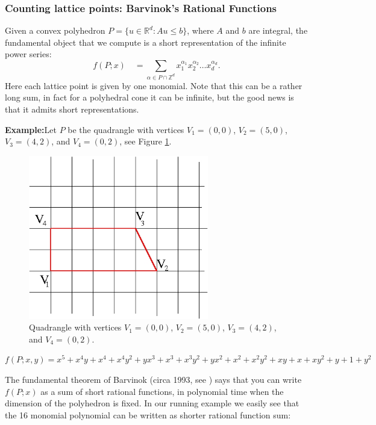 \documentclass{article}
\newcommand{\Z}{{\mathbb Z}}
\newcommand{\R}{{\mathbb R}}
\newcommand{\example}{{\bf Example:\space}}
\begin{document}
\subsubsection{Counting lattice points: Barvinok's Rational Functions}

Given a convex polyhedron $P = \{u\in\R^d:Au\leq b\}$, where $A$ and
$b$ are integral, the fundamental object that we compute is a short 
representation of the infinite power series:
\[
f(P;x) \quad = \sum_{\alpha\in P\cap\Z^d} x_1^{\alpha_1}
x_2^{\alpha_2} \ldots x_d^{\alpha_d}.
\]
Here each lattice point is given by one monomial. Note that this can be 
a rather long sum, in fact for a polyhedral cone it can be infinite, but 
the good news is that it admits short representations.

\example Let $P$ be the quadrangle with vertices 
$V_1=(0,0)$, $V_2=(5,0)$, $V_3=(4,2)$, and $V_4=(0,2)$, see Figure \ref{fig:quadrangle}.

\begin{figure}[thb]
        \centering
        \includegraphics[width=0.7\textwidth]{examplebrion.jpg}
        \caption{Quadrangle with vertices $V_1=(0,0)$, $V_2=(5,0)$, $V_3=(4,2)$, and $V_4=(0,2)$.}
        \label{fig:quadrangle}
\end{figure}

{\small
\noindent
$f(P;x,y)={x}^{5}+{x}^{4}y+{x}^{4}+{x}^{4}{y}^{2}+y{x}^{3}+{x}^{3}+
{x}^{3}{y}^{2}+y{x}^{2}+{x}^{2}+{x}^{2}{y}^{2}+xy+x+x{y}^{2}+y+1+
{y}^{2}$
}

The fundamental theorem of Barvinok (circa 1993, see \cite{BarviPom})
says that you can write $f(P;x)$ as a sum of short rational functions,
in polynomial time when the dimension of the polyhedron is fixed.
In our running example we easily see that the 16 monomial polynomial
can be written as shorter rational function sum:
\end{document}
